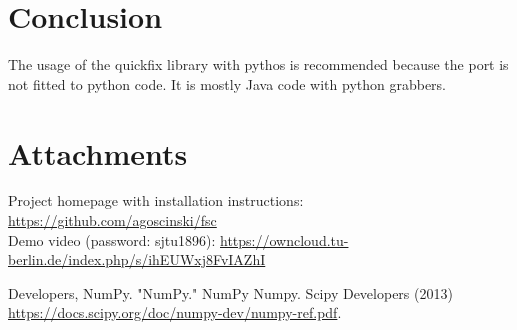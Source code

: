 \documentclass[a4paper, 11pt]{article}
\begin{document}
\section*{Conclusion}
The usage of the quickfix library with pythos is recommended because the port is not fitted to python code. It is mostly Java code with python grabbers.

\section*{Attachments}
Project homepage with installation instructions: \url{https://github.com/agoscinski/fsc} \\
Demo video (password: sjtu1896): \url{https://owncloud.tu-berlin.de/index.php/s/ihEUWxj8FvIAZhI}

\begin{thebibliography}{9}
 Developers, NumPy. "NumPy." NumPy Numpy. Scipy Developers (2013) \url{https://docs.scipy.org/doc/numpy-dev/numpy-ref.pdf}.
\end{thebibliography}
\end{document}
